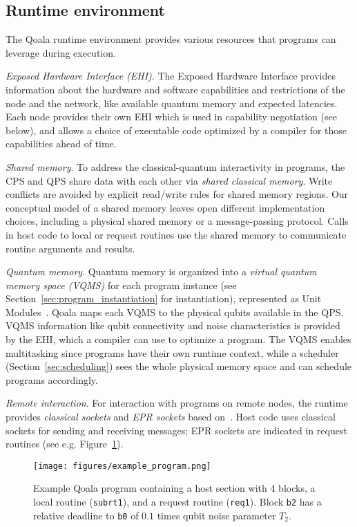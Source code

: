 \subsection{Runtime environment}
\label{sec:runtime_environment}
The Qoala runtime environment provides various resources that programs can leverage during execution.

\textit{Exposed Hardware Interface (EHI)}.
The Exposed Hardware Interface provides information about the hardware and software capabilities and restrictions of the node and the network,
like available quantum memory and expected latencies.
Each node provides their own EHI which is used in capability negotiation (see below), and allows a choice of executable code optimized by a compiler for those capabilities ahead of time. 

\textit{Shared memory}.
To address the classical-quantum interactivity in programs, the CPS and QPS share data with each other via \textit{shared classical memory}.
Write conflicts are avoided by explicit read/write rules for shared memory regions.
Our conceptual model of a shared memory leaves open different implementation choices, including a physical shared memory or a message-passing protocol.
Calls in host code to local or request routines use the shared memory to communicate routine arguments and results.

\textit{Quantum memory}.
Quantum memory is organized into a \textit{virtual quantum memory space (VQMS)} for each program instance (see Section~\ref{sec:program_instantiation} for instantiation), represented as Unit Modules~\cite{dahlberg2022netqasm}.
Qoala maps each VQMS to the physical qubits available in the QPS.
VQMS information like qubit connectivity and noise characteristics is provided by the EHI, which a compiler can use to optimize a program.
The VQMS enables multitasking since programs have their own runtime context, while a scheduler (Section~\ref{sec:scheduling}) sees the whole physical memory space and can schedule programs accordingly.

\textit{Remote interaction}. For interaction with programs on remote nodes,
the runtime provides \textit{classical sockets} and \textit{EPR sockets} based on~\cite{dahlberg2022netqasm}. Host code uses classical sockets for sending and receiving messages; EPR sockets are indicated in request routines (see e.g. Figure~\ref{fig:example_program}).

\begin{figure}%
    \centering
    \texttt{[image: figures/example\_program.png]}
    \caption{
        Example Qoala program containing a host section with 4 blocks, a local routine (\texttt{subrt1}),
        and a request routine (\texttt{req1}). Block \texttt{b2} has a relative deadline to \texttt{b0} of $0.1$ times qubit noise parameter $T_2$.
    }
    \label{fig:example_program}
\end{figure}

